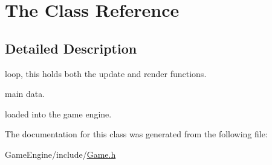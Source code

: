 \hypertarget{class_the}{}\section{The Class Reference}
\label{class_the}


\subsection{Detailed Description}
loop, this holds both the update and render functions.

main data.

loaded into the game engine. 

The documentation for this class was generated from the following file\+:\begin{DoxyCompactItemize}
\item 
Game\+Engine/include/\mbox{\hyperlink{_game_8h}{Game.\+h}}\end{DoxyCompactItemize}
